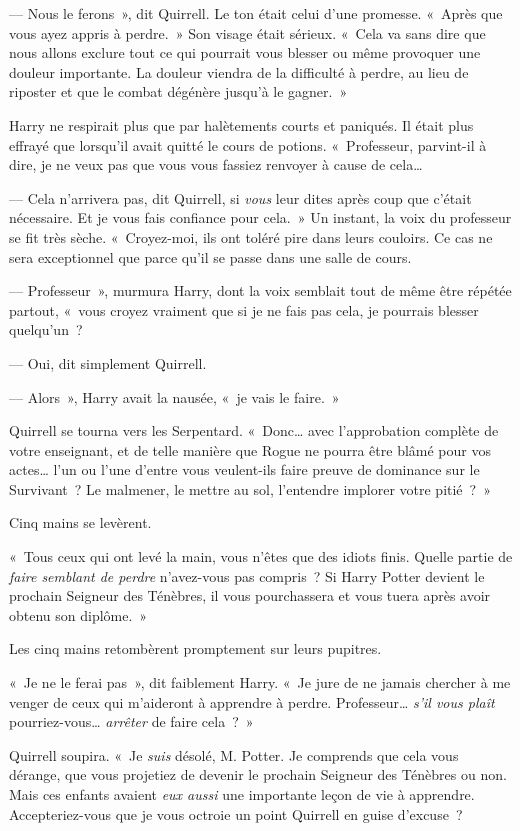 --- Nous le ferons~», dit Quirrell. Le ton était celui d'une promesse.
«~Après que vous ayez appris à perdre.~»
Son visage était sérieux.
«~Cela va sans dire que nous allons exclure tout ce qui pourrait vous blesser ou même provoquer une douleur importante.
La douleur viendra de la difficulté à perdre, au lieu de riposter et que le combat dégénère jusqu'à le gagner.~»

Harry ne respirait plus que par halètements courts et paniqués.
Il était plus effrayé que lorsqu'il avait quitté le cours de potions.
«~Professeur, parvint-il à dire, je ne veux pas que vous vous fassiez renvoyer à cause de cela…

--- Cela n'arrivera pas, dit Quirrell, si \emph{vous} leur dites après coup que c'était nécessaire.
Et je vous fais confiance pour cela.~»
Un instant, la voix du professeur se fit très sèche.
«~Croyez-moi, ils ont toléré pire dans leurs couloirs.
Ce cas ne sera exceptionnel que parce qu'il se passe dans une salle de cours.

--- Professeur~», murmura Harry, dont la voix semblait tout de même être répétée partout, «~vous croyez vraiment que si je ne fais pas cela, je pourrais blesser quelqu'un~?

--- Oui, dit simplement Quirrell.

--- Alors~», Harry avait la nausée, «~je vais le faire.~»

Quirrell se tourna vers les Serpentard.
«~Donc… avec l'approbation complète de votre enseignant, et de telle manière que Rogue ne pourra être blâmé pour vos actes… l'un ou l'une d'entre vous veulent-ils faire preuve de dominance sur le Survivant~?
Le malmener, le mettre au sol, l'entendre implorer votre pitié~?~»

Cinq mains se levèrent.

«~Tous ceux qui ont levé la main, vous n'êtes que des idiots finis.
Quelle partie de \emph{faire semblant de perdre} n'avez-vous pas compris~?
Si Harry Potter devient le prochain Seigneur des Ténèbres, il vous pourchassera et vous tuera après avoir obtenu son diplôme.~»

Les cinq mains retombèrent promptement sur leurs pupitres.

«~Je ne le ferai pas~», dit faiblement Harry.
«~Je jure de ne jamais chercher à me venger de ceux qui m'aideront à apprendre à perdre.
Professeur… \emph{s'il vous plaît} pourriez-vous… \emph{arrêter} de faire cela~?~»

Quirrell soupira.
«~Je \emph{suis} désolé, M. Potter.
Je comprends que cela vous dérange, que vous projetiez de devenir le prochain Seigneur des Ténèbres ou non.
Mais ces enfants avaient \emph{eux aussi} une importante leçon de vie à apprendre.
Accepteriez-vous que je vous octroie un point Quirrell en guise d'excuse~?


